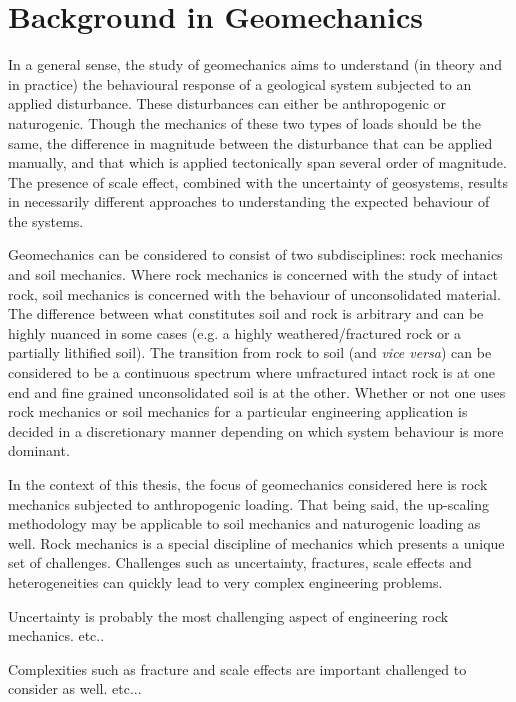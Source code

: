 \chapter{Background in Geomechanics}
In a general sense, the study of geomechanics aims to understand (in theory and in practice) the behavioural response of a geological system subjected to an applied disturbance. These disturbances can either be anthropogenic or naturogenic. Though the mechanics of these two types of loads should be the same, the difference in magnitude between the disturbance that can be applied manually, and that which is applied tectonically span several order of magnitude. The presence of scale effect, combined with the uncertainty of geosystems, results in necessarily different approaches to understanding the expected behaviour of the systems. 

Geomechanics can be considered to consist of two subdisciplines: rock mechanics and soil mechanics. Where rock mechanics is concerned with the study of intact rock, soil mechanics is concerned with the behaviour of unconsolidated material. The difference between what constitutes soil and rock is arbitrary and can be highly nuanced in some cases (e.g. a highly weathered/fractured rock or a partially lithified soil). The transition from rock to soil (and \textit{vice versa}) can be considered to be a continuous spectrum where unfractured intact rock is at one end and fine grained unconsolidated soil is at the other. Whether or not one uses rock mechanics or soil mechanics for a particular engineering application is decided in a discretionary manner depending on which system behaviour is more dominant.

In the context of this thesis, the focus of geomechanics considered here is rock mechanics subjected to anthropogenic loading. That being said, the up-scaling methodology may be applicable to soil mechanics and naturogenic loading as well.  
Rock mechanics is a special discipline of mechanics which presents a unique set of challenges. Challenges such as uncertainty, fractures, scale effects and heterogeneities can quickly lead to very complex engineering problems. 

Uncertainty is probably the most challenging aspect of engineering rock mechanics. etc..

Complexities such as fracture and scale effects are important challenged to consider as well. etc...


